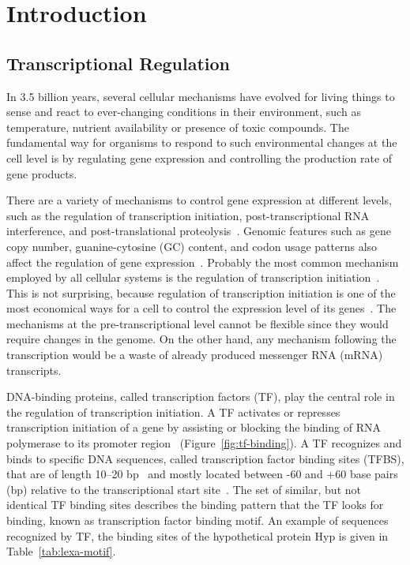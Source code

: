 
\chapter{Introduction}

\section{Transcriptional Regulation}

In 3.5 billion years, several
cellular mechanisms have evolved for living things to sense and react to
ever-changing conditions in their environment, such as temperature, nutrient
availability or presence of toxic compounds. The fundamental way for organisms
to respond to such environmental changes at the cell level is by regulating
gene expression and controlling the production rate of gene products.

There are a variety of mechanisms to control gene expression at different
levels, such as the regulation of transcription
initiation, post-transcriptional RNA interference, and post-translational
proteolysis~\citep{snyder2007molecular}. Genomic features such as gene copy
number, guanine-cytosine (GC) content, and codon usage patterns also affect the
regulation of gene expression~\citep{gustafsson2004codon,
  stranger2007relative}. Probably the most common mechanism employed by all
cellular systems is the regulation of transcription
initiation~\citep{browning2004regulation}. This is not surprising, because
regulation of transcription initiation is one of the most economical ways for a cell to
control the expression level of its genes~\citep{malacinski2005essentials}. The
mechanisms at the pre-transcriptional level cannot be flexible since they would
require changes in the genome. On the other hand, any mechanism following the
transcription would be a waste of already produced messenger RNA (mRNA)
transcripts.

DNA-binding proteins, called transcription factors (TF), play the central role
in the regulation of transcription initiation. A TF activates or represses
transcription initiation of a gene by assisting or blocking the binding of RNA
polymerase to its promoter region~\citep{reznikoff1985regulation} (Figure~\ref{fig:tf-binding}). A TF
recognizes and binds to specific DNA sequences, called transcription factor
binding sites (TFBS), that are of length 10--20 bp~\citep{gerland2002physical,
  berg2004adaptive} and mostly located between -60 and +60 base pairs (bp)
relative to the transcriptional start site~\citep{collado1991control}. The set
of similar, but not identical TF binding sites describes the binding pattern
that the TF looks for binding, known as transcription factor binding motif. An
example of sequences recognized by TF, the binding sites of the hypothetical
protein Hyp is given in Table~\ref{tab:lexa-motif}.

